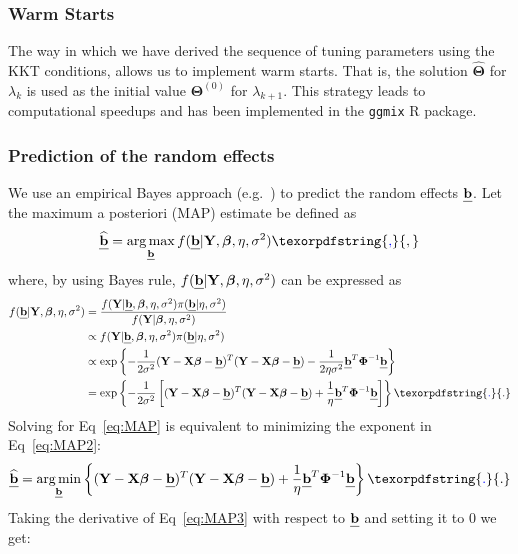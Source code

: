 \documentclass[10pt,letterpaper]{article}
\newcommand{\bX}{\textbf{X}}
\newcommand{\bY}{\textbf{Y}}
\newcommand{\bb}{\textbf{\emph{b}}}
\newcommand{\bTheta}{\boldsymbol{\Theta}}
\newcommand{\bbeta}{\boldsymbol{\beta}}
\newcommand{\bPhi}{\boldsymbol{\Phi}}
\DeclareMathOperator*{\argmin}{arg\,min}
\DeclareMathOperator*{\argmax}{arg\,max}
\providecommand{\DIFaddtex}[1]{{\protect\color{blue}\uwave{#1}}} %
\providecommand{\DIFaddbegin}{} %
\providecommand{\DIFaddend}{} %
\providecommand{\DIFadd}[1]{\texorpdfstring{\DIFaddtex{#1}}{#1}} %
\newcommand{\DIFaddincludegraphics}[2][]{{\color{blue}\fbox{\DIFOincludegraphics[#1]{#2}}}} %
\DeclareRobustCommand{\DIFaddbegin}{\DIFOaddbegin \let\includegraphics\DIFaddincludegraphics} %
\DeclareRobustCommand{\DIFaddend}{\DIFOaddend \let\includegraphics\DIFOincludegraphics} %
\begin{document}
\subsubsection*{Warm Starts}
The way in which we have derived the sequence of tuning parameters using the KKT conditions, allows us to implement warm starts. That is, the solution $\widehat{\bTheta}$ for $\lambda_k$ is used as the initial value $\bTheta^{(0)}$ for $\lambda_{k+1}$. This strategy leads to computational speedups and has been implemented in the \texttt{ggmix} R package.


\subsubsection*{Prediction of the random effects}
We use an empirical Bayes approach (e.g.~\cite{wakefield2013bayesian}) to predict the random effects $\bb$. Let the maximum a posteriori (MAP) estimate be defined as
\begin{equation}
\widehat{\bb} = \argmax_{\bb} f(\bb |  \bY, \bbeta, \eta, \sigma^2)  \label{eq:MAP}\DIFaddbegin \DIFadd{,
}\DIFaddend \end{equation}
where, by using Bayes rule, $f(\bb |  \bY, \bbeta, \eta, \sigma^2)$ can be expressed as
\begin{align}
f(\bb |  \bY, \bbeta, \eta, \sigma^2) & = \frac{f(\bY | \bb,  \bbeta, \eta, \sigma^2)  \pi(\bb | \eta, \sigma^2)}{f(\bY |  \bbeta, \eta, \sigma^2)} \nonumber \\
& \propto f(\bY | \bb,  \bbeta, \eta, \sigma^2)  \pi(\bb | \eta, \sigma^2) \nonumber\\
& \propto \exp \left\lbrace - \frac{1}{2 \sigma^2} (\bY - \bX \bbeta - \bb)^T  (\bY - \bX \bbeta - \bb) - \frac{1}{2\eta \sigma^2}\bb^T \bPhi^{-1}\bb   \right \rbrace \nonumber\\
& = \exp \left\lbrace - \frac{1}{2 \sigma^2} \left[  (\bY - \bX \bbeta - \bb)^T (\bY - \bX \bbeta - \bb) + \frac{1}{\eta }\bb^T \bPhi^{-1}\bb \right]    \right \rbrace \label{eq:MAP2}\DIFaddbegin \DIFadd{.
}\DIFaddend \end{align}
Solving for Eq~\ref{eq:MAP} is equivalent to minimizing the exponent in Eq~\ref{eq:MAP2}:
\begin{align}
\widehat{\bb} = \argmin_{\bb} \left\lbrace (\bY - \bX \bbeta - \bb)^T  (\bY - \bX \bbeta - \bb) + \frac{1}{\eta }\bb^T \bPhi^{-1}\bb  \right\rbrace \label{eq:MAP3}\DIFaddbegin \DIFadd{.
}\DIFaddend \end{align}
Taking the derivative of Eq~\ref{eq:MAP3} with respect to $\bb$ and setting it to 0 we get:
\end{document}
